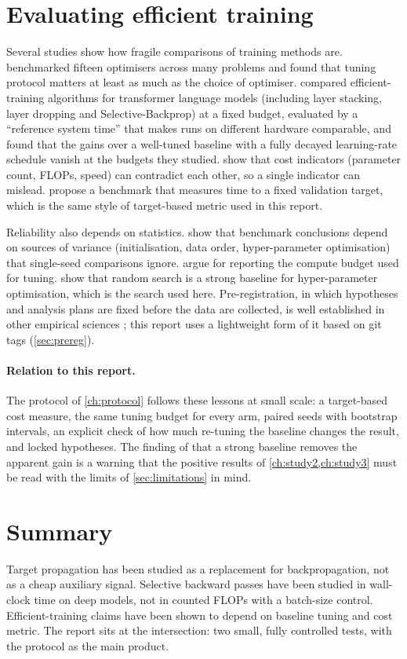 \section{Evaluating efficient training}\label{sec:related-eval}
Several studies show how fragile comparisons of training methods are. \citet{schmidt2021crowded} benchmarked fifteen optimisers across many problems and found that tuning protocol matters at least as much as the choice of optimiser. \citet{kaddour2023notrain} compared efficient-training algorithms for transformer language models (including layer stacking, layer dropping and Selective-Backprop) at a fixed budget, evaluated by a ``reference system time'' that makes runs on different hardware comparable, and found that the gains over a well-tuned baseline with a fully decayed learning-rate schedule vanish at the budgets they studied. \citet{dehghani2022efficiency} show that cost indicators (parameter count, FLOPs, speed) can contradict each other, so a single indicator can mislead. \citet{dahl2023benchmarking} propose a benchmark that measures time to a fixed validation target, which is the same style of target-based metric used in this report.

Reliability also depends on statistics. \citet{bouthillier2021accounting} show that benchmark conclusions depend on sources of variance (initialisation, data order, hyper-parameter optimisation) that single-seed comparisons ignore. \citet{dodge2019show} argue for reporting the compute budget used for tuning. \citet{bergstra2012random} show that random search is a strong baseline for hyper-parameter optimisation, which is the search used here. Pre-registration, in which hypotheses and analysis plans are fixed before the data are collected, is well established in other empirical sciences \citep{nosek2018preregistration}; this report uses a lightweight form of it based on git tags (\cref{sec:prereg}).

\paragraph{Relation to this report.} The protocol of \cref{ch:protocol} follows these lessons at small scale: a target-based cost measure, the same tuning budget for every arm, paired seeds with bootstrap intervals, an explicit check of how much re-tuning the baseline changes the result, and locked hypotheses. The finding of \citet{kaddour2023notrain} that a strong baseline removes the apparent gain is a warning that the positive results of \cref{ch:study2,ch:study3} must be read with the limits of \cref{sec:limitations} in mind.

\section{Summary}
Target propagation has been studied as a replacement for backpropagation, not as a cheap auxiliary signal. Selective backward passes have been studied in wall-clock time on deep models, not in counted FLOPs with a batch-size control. Efficient-training claims have been shown to depend on baseline tuning and cost metric. The report sits at the intersection: two small, fully controlled tests, with the protocol as the main product.
